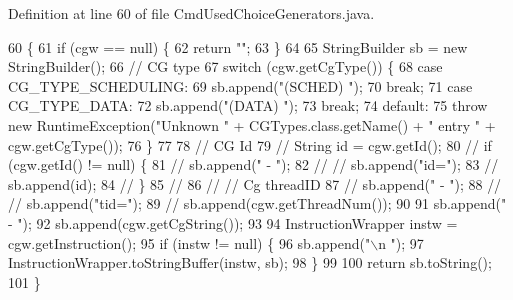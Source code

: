 Definition at line 60 of file Cmd\+Used\+Choice\+Generators.\+java.


\begin{DoxyCode}
60                                                                      \{
61     \textcolor{keywordflow}{if} (cgw == null) \{
62       \textcolor{keywordflow}{return} \textcolor{stringliteral}{""};
63     \}
64 
65     StringBuilder sb = \textcolor{keyword}{new} StringBuilder();
66     \textcolor{comment}{// CG type}
67     \textcolor{keywordflow}{switch} (cgw.getCgType()) \{
68     \textcolor{keywordflow}{case} CG\_TYPE\_SCHEDULING:
69       sb.append(\textcolor{stringliteral}{"(SCHED) "});
70       \textcolor{keywordflow}{break};
71     \textcolor{keywordflow}{case} CG\_TYPE\_DATA:
72       sb.append(\textcolor{stringliteral}{"(DATA)  "});
73       \textcolor{keywordflow}{break};
74     \textcolor{keywordflow}{default}:
75       \textcolor{keywordflow}{throw} \textcolor{keyword}{new} RuntimeException(\textcolor{stringliteral}{"Unknown "} + CGTypes.class.getName() + \textcolor{stringliteral}{" entry "} + cgw.getCgType());
76     \}
77 
78     \textcolor{comment}{// CG Id}
79     \textcolor{comment}{// String id = cgw.getId();}
80     \textcolor{comment}{// if (cgw.getId() != null) \{}
81     \textcolor{comment}{// sb.append(" - ");}
82     \textcolor{comment}{// // sb.append("id=");}
83     \textcolor{comment}{// sb.append(id);}
84     \textcolor{comment}{// \}}
85     \textcolor{comment}{//}
86     \textcolor{comment}{// // Cg threadID}
87     \textcolor{comment}{// sb.append(" - ");}
88     \textcolor{comment}{// // sb.append("tid=");}
89     \textcolor{comment}{// sb.append(cgw.getThreadNum());}
90 
91     sb.append(\textcolor{stringliteral}{" - "});
92     sb.append(cgw.getCgString());
93 
94     InstructionWrapper instw = cgw.getInstruction();
95     \textcolor{keywordflow}{if} (instw != null) \{
96       sb.append(\textcolor{stringliteral}{"\(\backslash\)n            "});
97       InstructionWrapper.toStringBuffer(instw, sb);
98     \}
99 
100     \textcolor{keywordflow}{return} sb.toString();
101   \}
\end{DoxyCode}
